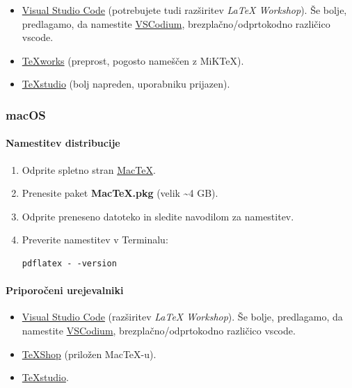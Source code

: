 \begin{itemize}
\item \href{https://code.visualstudio.com/}{Visual Studio Code} (potrebujete tudi razširitev \textit{LaTeX Workshop}). Še bolje, predlagamo, da namestite \href{https://vscodium.com/}{VSCodium}, brezplačno/odprtokodno različico vscode.
\item \href{https://www.tug.org/texworks/}{TeXworks} (preprost, pogosto nameščen z MiKTeX).
\item \href{https://www.texstudio.org/}{TeXstudio} (bolj napreden, uporabniku prijazen).
\end{itemize}

\subsubsection{macOS}

\paragraph{Namestitev distribucije}

\begin{enumerate}
\item Odprite spletno stran \href{https://tug.org/mactex/}{MacTeX}.
\item Prenesite paket \textbf{MacTeX.pkg} (velik {\textasciitilde}4 GB).
\item Odprite preneseno datoteko in sledite navodilom za namestitev.
\item Preverite namestitev v Terminalu:

\begin{verbatim}
pdflatex - -version
\end{verbatim}
\end{enumerate}

\paragraph{Priporočeni urejevalniki}

\begin{itemize}
\item \href{https://code.visualstudio.com/}{Visual Studio Code} (razširitev \textit{LaTeX Workshop}).
Še bolje, predlagamo, da namestite \href{https://vscodium.com/}{VSCodium}, brezplačno/odprtokodno različico vscode.
\item \href{https://pages.uoregon.edu/koch/texshop/}{TeXShop} (priložen MacTeX-u).
\item \href{https://www.texstudio.org/}{TeXstudio}.
\end{itemize}

